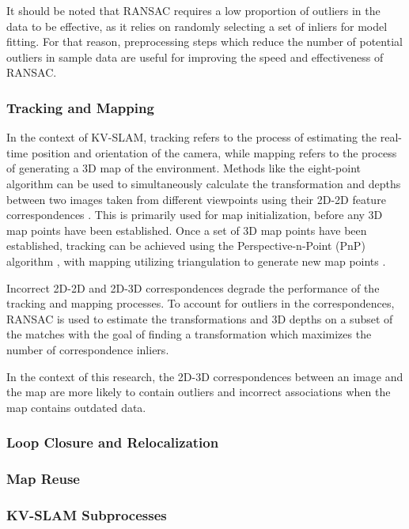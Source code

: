 It should be noted that RANSAC requires a low proportion of outliers in the data to be effective, as it relies on randomly selecting a set of inliers for model fitting. For that reason, preprocessing steps which reduce the number of potential outliers in sample data are useful for improving the speed and effectiveness of RANSAC.

\subsubsection{Tracking and Mapping}

In the context of KV-SLAM, tracking refers to the process of estimating the real-time position and orientation of the camera, while mapping refers to the process of generating a 3D map of the environment. Methods like the eight-point algorithm can be used to simultaneously calculate the transformation and depths between two images taken from different viewpoints using their 2D-2D feature correspondences \cite{longuet-higginsComputerAlgorithmReconstructing1981}\cite{hartleyDefenseEightpointAlgorithm1997}. This is primarily used for map initialization, before any 3D map points have been established. Once a set of 3D map points have been established, tracking can be achieved using the Perspective-n-Point (PnP) algorithm \cite{fischlerRandomSampleConsensus1981}, with mapping utilizing triangulation to generate new map points \cite{davisonRealtimeSimultaneousLocalisation2003}.

Incorrect 2D-2D and 2D-3D correspondences degrade the performance of the tracking and mapping processes. To account for outliers in the correspondences, RANSAC is used to estimate the transformations and 3D depths on a subset of the matches with the goal of finding a transformation which maximizes the number of correspondence inliers.

In the context of this research, the 2D-3D correspondences between an image and the map are more likely to contain outliers and incorrect associations when the map contains outdated data. 

\subsubsection{Loop Closure and Relocalization}

\subsubsection{Map Reuse}

\subsubsection{KV-SLAM Subprocesses}